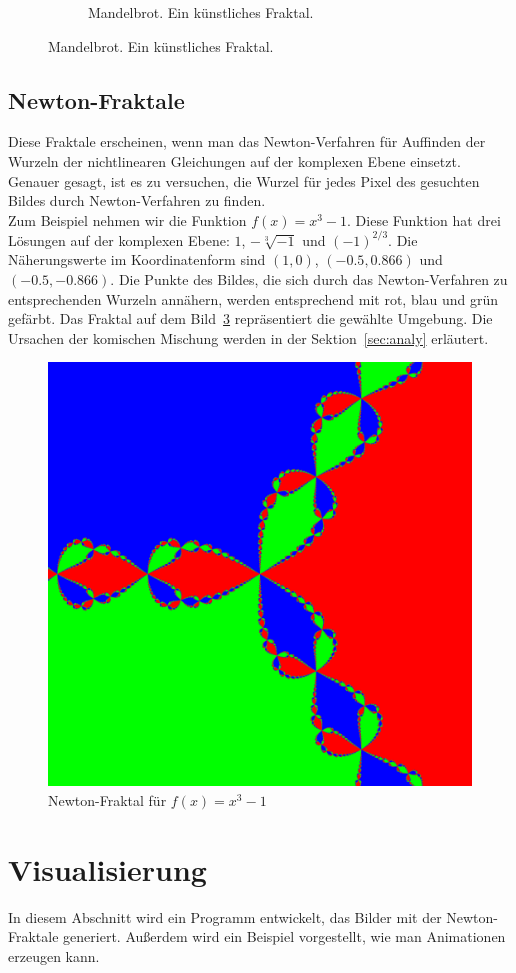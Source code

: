 \documentclass[a4paper,12pt]{llncs}
\numberwithin{equation}{section}
\begin{document}
\begin{figure}[ht]
\begin{subfigure}{.5\textwidth}
		\caption{Mandelbrot. Ein künstliches Fraktal.~\cite{fractal_mandelbrot}}
		\label{fig:frac_math}
	\end{subfigure}%
\end{figure}

\subsection{Newton-Fraktale}
Diese Fraktale erscheinen, wenn man das Newton-Verfahren für Auffinden der Wurzeln der nichtlinearen Gleichungen auf der komplexen Ebene einsetzt.
Genauer gesagt, ist es zu versuchen, die Wurzel für jedes Pixel des gesuchten Bildes durch Newton-Verfahren zu finden.\\
Zum Beispiel nehmen wir die Funktion $f(x) = x^3 -1$. 
Diese Funktion hat drei Lösungen auf der komplexen Ebene: $1$, $-\sqrt[3]{-1}$ und $(-1)^{2/3}$. 
Die Näherungswerte im Koordinatenform sind $(1, 0)$, $(-0.5, 0.866)$ und $(-0.5, -0.866)$. 
Die Punkte des Bildes, die sich durch das Newton-Verfahren zu entsprechenden Wurzeln annähern, werden entsprechend mit rot, blau und grün gefärbt.
Das Fraktal auf dem Bild~\ref{fig:output3_0} repräsentiert die gewählte Umgebung.
Die Ursachen der komischen Mischung werden in der Sektion~\ref{sec:analy} erläutert.
\begin{figure}[ht]   
	\centering
	\includegraphics[width=.5\linewidth]{figures/output3_0}
	\caption{Newton-Fraktal für $f(x)=x^3-1$ }
	\label{fig:output3_0}
\end{figure}

\section{Visualisierung}\label{sec:vis}
In diesem Abschnitt wird ein Programm entwickelt, das Bilder mit der Newton-Fraktale generiert.
Außerdem wird ein Beispiel vorgestellt, wie man Animationen erzeugen kann.
\end{document}
